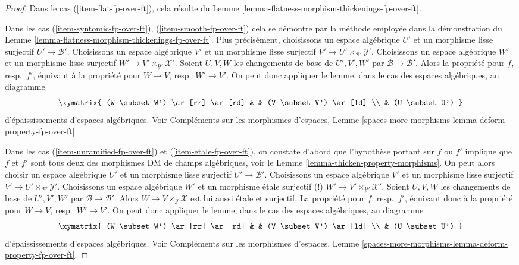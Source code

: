 \begin{proof}
Dans le cas (\ref{item-flat-fp-over-ft}), cela résulte du
Lemme \ref{lemma-flatness-morphism-thickenings-fp-over-ft}.

\medskip\noindent
Dans les cas
(\ref{item-syntomic-fp-over-ft}), (\ref{item-smooth-fp-over-ft})
cela se démontre par la méthode employée dans la démonstration du
Lemme \ref{lemma-flatness-morphism-thickenings-fp-over-ft}.
Plus précisément, choisissons un espace algébrique $U'$ et un morphisme lisse surjectif
$U' \to \mathcal{B}'$.
Choisissons un espace algébrique $V'$ et un morphisme lisse surjectif
$V' \to U' \times_{\mathcal{B}'} \mathcal{Y}'$.
Choisissons un espace algébrique $W'$ et un morphisme lisse surjectif
$W' \to V' \times_{\mathcal{Y}'} \mathcal{X}'$. Soient $U, V, W$
les changements de base de $U', V', W'$ par $\mathcal{B} \to \mathcal{B}'$.
Alors la propriété pour $f$, resp.\ $f'$,
équivaut à la propriété pour $W \to V$, resp.\ $W' \to V'$.
On peut donc appliquer le lemme, dans le cas des espaces algébriques, au
diagramme
$$
\xymatrix{
(W \subset W') \ar[rr] \ar[rd] & & (V \subset V') \ar[ld] \\
& (U \subset U')
}
$$
d'épaississements d'espaces algébriques. Voir
Compléments sur les morphismes d'espaces, Lemme
\ref{spaces-more-morphisms-lemma-deform-property-fp-over-ft}.

\medskip\noindent
Dans les cas (\ref{item-unramified-fp-over-ft}) et (\ref{item-etale-fp-over-ft}),
on constate d'abord que l'hypothèse portant sur $f$ ou $f'$ implique que
$f$ et $f'$ sont tous deux des morphismes DM de champs algébriques, voir
le Lemme \ref{lemma-thicken-property-morphisms}. On peut alors choisir
un espace algébrique $U'$ et un morphisme lisse surjectif
$U' \to \mathcal{B}'$.
Choisissons un espace algébrique $V'$ et un morphisme lisse surjectif
$V' \to U' \times_{\mathcal{B}'} \mathcal{Y}'$.
Choisissons un espace algébrique $W'$ et un morphisme \'etale surjectif (!)
$W' \to V' \times_{\mathcal{Y}'} \mathcal{X}'$. Soient $U, V, W$
les changements de base de $U', V', W'$ par $\mathcal{B} \to \mathcal{B}'$.
Alors $W \to V \times_\mathcal{Y} \mathcal{X}$ est lui aussi
\'etale et surjectif. La propriété pour $f$, resp.\ $f'$,
équivaut donc à la propriété pour $W \to V$, resp.\ $W' \to V'$.
On peut donc appliquer le lemme, dans le cas des espaces algébriques, au
diagramme
$$
\xymatrix{
(W \subset W') \ar[rr] \ar[rd] & & (V \subset V') \ar[ld] \\
& (U \subset U')
}
$$
d'épaississements d'espaces algébriques. Voir
Compléments sur les morphismes d'espaces, Lemme
\ref{spaces-more-morphisms-lemma-deform-property-fp-over-ft}.


\end{proof}
